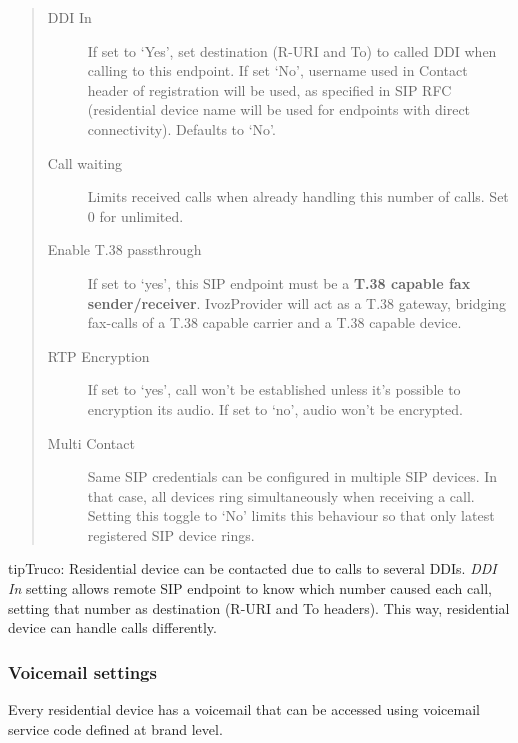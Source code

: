 \documentclass[letterpaper,10pt,spanish]{sphinxmanual}
\begin{document}
\begin{quote}
\begin{description}
\item[{DDI In}] \leavevmode
If set to `Yes', set destination (R-URI and To) to called DDI when calling to this endpoint. If set `No', username
used in Contact header of registration will be used, as specified in SIP RFC (residential device name will be used
for endpoints with direct connectivity). Defaults to `No'.

\item[{Call waiting}] \leavevmode
Limits received calls when already handling this number of calls. Set 0 for unlimited.

\item[{Enable T.38 passthrough}] \leavevmode
If set to `yes', this SIP endpoint must be a \textbf{T.38 capable fax sender/receiver}. IvozProvider
will act as a T.38 gateway, bridging fax-calls of a T.38 capable carrier and a T.38 capable device.

\item[{RTP Encryption}] \leavevmode
If set to `yes', call won't be established unless it's possible to encryption its audio. If set to `no',
audio won't be encrypted.

\item[{Multi Contact}] \leavevmode
Same SIP credentials can be configured in multiple SIP devices. In that case, all devices ring
simultaneously when receiving a call. Setting this toggle to `No' limits this behaviour so that
only latest registered SIP device rings.

\end{description}
\end{quote}

\begin{notice}{tip}{Truco:}
Residential device can be contacted due to calls to several DDIs. \emph{DDI In} setting allows remote SIP endpoint to
know which number caused each call, setting that number as destination (R-URI and To headers). This way, residential
device can handle calls differently.
\end{notice}


\subsubsection{Voicemail settings}
\label{administration_portal/client/residential/residential_devices:voicemail-settings}
Every residential device has a voicemail that can be accessed using voicemail service code defined at brand level.
\end{document}
